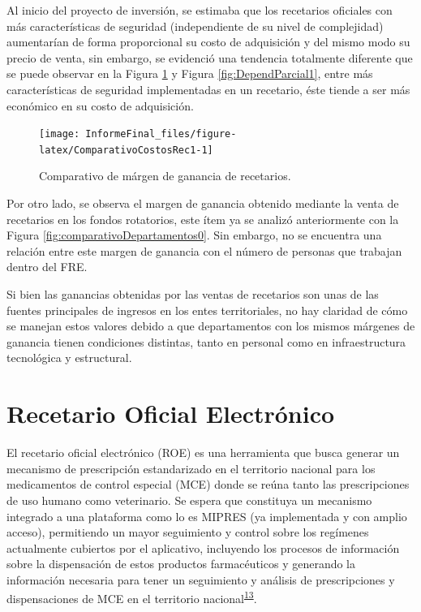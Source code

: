 \documentclass[
]{book}
\begin{document}
Al inicio del proyecto de inversión, se estimaba que los recetarios oficiales con más características de seguridad (independiente de su nivel de complejidad) aumentarían de forma proporcional su costo de adquisición y del mismo modo su precio de venta, sin embargo, se evidenció una tendencia totalmente diferente que se puede observar en la Figura \ref{fig:ComparativoCostosRec1} y Figura \ref{fig:DependParcial1}, entre más características de seguridad implementadas en un recetario, éste tiende a ser más económico en su costo de adquisición.

\begin{figure}

{\centering \texttt{[image: InformeFinal\_files/figure-latex/ComparativoCostosRec1-1]} 

}

\caption{Comparativo de márgen de ganancia de recetarios.}\label{fig:ComparativoCostosRec1}
\end{figure}

Por otro lado, se observa el margen de ganancia obtenido mediante la venta de recetarios en los fondos rotatorios, este ítem ya se analizó anteriormente con la Figura \ref{fig:comparativoDepartamentos0}. Sin embargo, no se encuentra una relación entre este margen de ganancia con el número de personas que trabajan dentro del FRE.

Si bien las ganancias obtenidas por las ventas de recetarios son unas de las fuentes principales de ingresos en los entes territoriales, no hay claridad de cómo se manejan estos valores debido a que departamentos con los mismos márgenes de ganancia tienen condiciones distintas, tanto en personal como en infraestructura tecnológica y estructural.

\hypertarget{recetario-oficial-electruxf3nico}{%
\section{Recetario Oficial Electrónico}\label{recetario-oficial-electruxf3nico}}

El recetario oficial electrónico (ROE) es una herramienta que busca generar un mecanismo de prescripción estandarizado en el territorio nacional para los medicamentos de control especial (MCE) donde se reúna tanto las prescripciones de uso humano como veterinario. Se espera que constituya un mecanismo integrado a una plataforma como lo es MIPRES (ya implementada y con amplio acceso), permitiendo un mayor seguimiento y control sobre los regímenes actualmente cubiertos por el aplicativo, incluyendo los procesos de información sobre la dispensación de estos productos farmacéuticos y generando la información necesaria para tener un seguimiento y análisis de prescripciones y dispensaciones de MCE en el territorio nacional\textsuperscript{\protect\hyperlink{ref-CuervoBustamante2021}{13}}.
\end{document}
